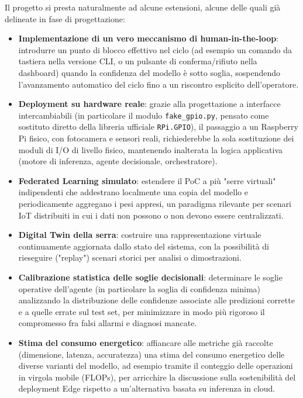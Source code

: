 Il progetto si presta naturalmente ad alcune estensioni, alcune delle quali
già delineate in fase di progettazione:

\begin{itemize}
    \item \textbf{Implementazione di un vero meccanismo di human-in-the-loop}:
    introdurre un punto di blocco effettivo nel ciclo (ad esempio un
    comando da tastiera nella versione CLI, o un pulsante di
    conferma/rifiuto nella dashboard) quando la confidenza del modello è
    sotto soglia, sospendendo l'avanzamento automatico del ciclo fino a un
    riscontro esplicito dell'operatore.
    \item \textbf{Deployment su hardware reale}: grazie alla progettazione a
    interfacce intercambiabili (in particolare il modulo
    \texttt{fake\_gpio.py}, pensato come sostituto diretto della libreria
    ufficiale \texttt{RPi.GPIO}), il passaggio a un Raspberry Pi fisico, con
    fotocamera e sensori reali, richiederebbe la sola sostituzione dei
    moduli di I/O di livello fisico, mantenendo inalterata la logica
    applicativa (motore di inferenza, agente decisionale, orchestratore).
    \item \textbf{Federated Learning simulato}: estendere il PoC a più
    "serre virtuali" indipendenti che addestrano localmente una copia del
    modello e periodicamente aggregano i pesi appresi, un paradigma
    rilevante per scenari IoT distribuiti in cui i dati non possono o non
    devono essere centralizzati.
    \item \textbf{Digital Twin della serra}: costruire una rappresentazione
    virtuale continuamente aggiornata dallo stato del sistema, con la
    possibilità di rieseguire ("replay") scenari storici per analisi o
    dimostrazioni.
    \item \textbf{Calibrazione statistica delle soglie decisionali}:
    determinare le soglie operative dell'agente (in particolare la soglia
    di confidenza minima) analizzando la distribuzione delle confidenze
    associate alle predizioni corrette e a quelle errate sul test set, per
    minimizzare in modo più rigoroso il compromesso fra falsi allarmi e
    diagnosi mancate.
    \item \textbf{Stima del consumo energetico}: affiancare alle metriche
    già raccolte (dimensione, latenza, accuratezza) una stima del consumo
    energetico delle diverse varianti del modello, ad esempio tramite il
    conteggio delle operazioni in virgola mobile (FLOPs), per arricchire la
    discussione sulla sostenibilità del deployment Edge rispetto a
    un'alternativa basata su inferenza in cloud.
\end{itemize}
